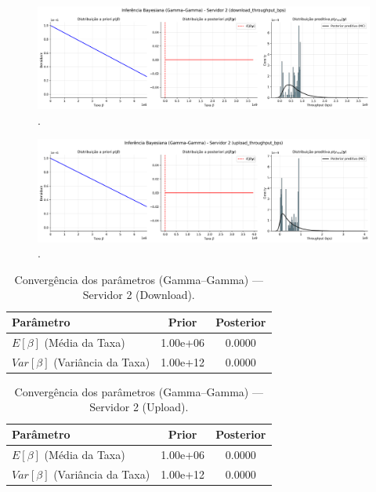 \documentclass{article}
\begin{document}
\begin{figure}[htp]
	\centering
	\includegraphics[width=\textwidth]{../figures/bayes/download_throughput_bps_bayesian_gammagamma_server02.png}
	\caption{.}
	\label{fig:download_throughput_bps_bayesian_gammagamma_server02}
\end{figure}
\begin{figure}[htp]
	\centering
	\includegraphics[width=\textwidth]{../figures/bayes/upload_throughput_bps_bayesian_gammagamma_server02.png}
	\caption{.}
	\label{fig:upload_throughput_bps_bayesian_gammagamma_server02}
\end{figure}

\begin{table}[htp]
	\centering
	\caption{Convergência dos parâmetros (Gamma–Gamma) — Servidor 2 (Download).}
	\label{tab:bayes_gamma_download_server02}
	\begin{tabular}{lcc}
		\hline
		\textbf{Parâmetro} & \textbf{Prior} & \textbf{Posterior} \\ \hline
		$E[\beta]$ (Média da Taxa) & 1.00e+06 & 0.0000 \\
		$Var[\beta]$ (Variância da Taxa) & 1.00e+12 & 0.0000 \\ \hline
	\end{tabular}
\end{table}

\begin{table}[htp]
	\centering
	\caption{Convergência dos parâmetros (Gamma–Gamma) — Servidor 2 (Upload).}
	\label{tab:bayes_gamma_upload_server02}
	\begin{tabular}{lcc}
		\hline
		\textbf{Parâmetro} & \textbf{Prior} & \textbf{Posterior} \\ \hline
		$E[\beta]$ (Média da Taxa) & 1.00e+06 & 0.0000 \\
		$Var[\beta]$ (Variância da Taxa) & 1.00e+12 & 0.0000 \\ \hline
	\end{tabular}
\end{table}
\end{document}
